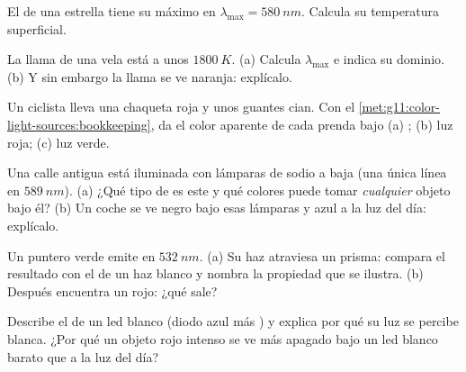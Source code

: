 \begin{exercise}[$\star$]\label{exo:g11:color-light-sources:5}
El  de una estrella tiene su máximo en
$\lambda_{\max} = \qty{580}{nm}$. Calcula su temperatura superficial.
\end{exercise}

\begin{exercise}[$\star\star$]\label{exo:g11:color-light-sources:6}
La llama de una vela está a unos $\qty{1800}{K}$. (a) Calcula
$\lambda_{\max}$ e indica su dominio. (b) Y sin embargo la llama se ve
naranja: explícalo.
\end{exercise}

\begin{exercise}[$\star\star$]\label{exo:g11:color-light-sources:7}
Un ciclista lleva una chaqueta roja y unos guantes cian. Con el
\cref{met:g11:color-light-sources:bookkeeping}, da el color aparente de
cada prenda bajo (a) ; (b) luz roja; (c) luz verde.
\end{exercise}

\begin{exercise}[$\star\star$]\label{exo:g11:color-light-sources:8}
Una calle antigua está iluminada con lámparas de sodio a baja 
(una única línea en $\qty{589}{nm}$). (a) ¿Qué tipo de  es este
y qué colores puede tomar \emph{cualquier} objeto bajo él? (b) Un coche
se ve negro bajo esas lámparas y azul a la luz del día: explícalo.
\end{exercise}

\begin{exercise}[$\star\star$]\label{exo:g11:color-light-sources:9}
Un puntero  verde emite en $\qty{532}{nm}$. (a) Su haz atraviesa un
prisma: compara el resultado con el de un haz blanco y nombra la
propiedad que se ilustra. (b) Después encuentra un  rojo: ¿qué
sale?
\end{exercise}

\begin{exercise}[$\star\star$]\label{exo:g11:color-light-sources:10}
Describe el  de un led blanco (diodo azul más ) y explica
por qué su luz se percibe blanca. ¿Por qué un objeto rojo intenso se ve
más apagado bajo un led blanco barato que a la luz del día?
\end{exercise}

